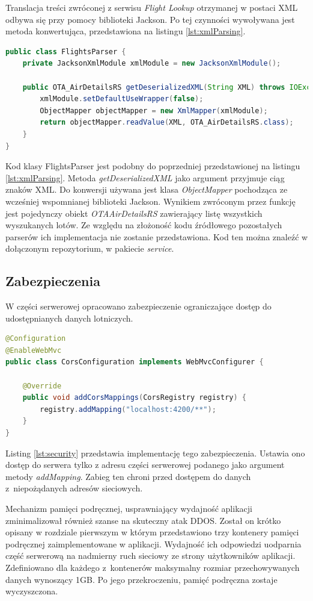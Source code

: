 \documentclass[12pt, twoside]{report}
\begin{document}
Translacja treści zwróconej z serwisu \textit{Flight Lookup} otrzymanej w postaci XML odbywa się przy pomocy biblioteki Jackson. Po tej czynności wywoływana jest metoda konwertująca, przedstawiona na listingu \ref{lst:xmlParsing}.
\begin{lstlisting}[language=java, caption=Implementacja parsowania treści XML, label=lst:xmlParsing]
public class FlightsParser {
    private JacksonXmlModule xmlModule = new JacksonXmlModule();

    public OTA_AirDetailsRS getDeserializedXML(String XML) throws IOException {
        xmlModule.setDefaultUseWrapper(false);
        ObjectMapper objectMapper = new XmlMapper(xmlModule);
        return objectMapper.readValue(XML, OTA_AirDetailsRS.class);
    }
}
\end{lstlisting}
Kod klasy FlightsParser jest podobny do poprzedniej przedstawionej na listingu \ref{lst:xmlParsing}. Metoda \textit{getDeserializedXML} jako argument przyjmuje ciąg znaków XML. Do konwersji używana jest klasa \textit{ObjectMapper} pochodząca ze wcześniej wspomnianej biblioteki Jackson. Wynikiem zwróconym przez funkcję jest pojedynczy obiekt \textit{OTAAirDetailsRS} zawierający listę wszystkich wyszukanych lotów.
Ze względu na złożoność kodu źródłowego pozostałych parserów ich implementacja nie zostanie przedstawiona. Kod ten można znaleźć w dołączonym repozytorium, w pakiecie \textit{service}.

\subsection{Zabezpieczenia}
W części serwerowej opracowano zabezpieczenie ograniczające dostęp do udostępnianych danych lotniczych.
\begin{lstlisting}[language=java, caption=Implementacja zabezpieczanie dostępu do serwera, label=lst:security]
@Configuration
@EnableWebMvc
public class CorsConfiguration implements WebMvcConfigurer {

    @Override
    public void addCorsMappings(CorsRegistry registry) {
        registry.addMapping("localhost:4200/**");
    }
}
\end{lstlisting}
Listing \ref{lst:security} przedstawia implementację tego zabezpieczenia. Ustawia ono dostęp do serwera tylko z adresu części serwerowej podanego jako argument metody \textit{addMapping}. Zabieg ten chroni przed dostępem do danych z~niepożądanych adresów sieciowych. 

Mechanizm pamięci podręcznej, usprawniający wydajność aplikacji zminimalizował również szanse na skuteczny atak DDOS. Został on krótko opisany w rozdziale pierwszym w którym przedstawiono trzy kontenery pamięci podręcznej zaimplementowane w aplikacji. Wydajność ich odpowiedzi uodparnia część serwerową na nadmierny ruch sieciowy ze strony użytkowników aplikacji. Zdefiniowano dla każdego z~kontenerów maksymalny rozmiar przechowywanych danych wynoszący 1GB. Po jego przekroczeniu, pamięć podręczna zostaje wyczyszczona.
\end{document}
